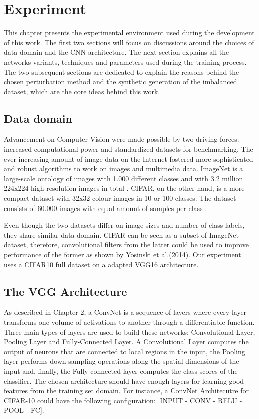 \chapter{Experiment}

This chapter presents the experimental environment used during the development of this work. The first two sections will focus on discussions around the choices of data domain and the CNN architecture. The next section explains all the networks variants, techniques and parameters used during the training process. The two subsequent sections are dedicated to explain the reasons behind the chosen perturbation method and the synthetic generation of the imbalanced dataset, which are the core ideas behind this work.
\section{Data domain}

Advancement on Computer Vision were made possible by two driving forces: increased computational power and standardized datasets for benchmarking. The ever increasing amount of image data on the Internet fostered more sophisticated and robust algorithms to work on images and multimedia data. ImageNet is a large-scale ontology of images with 1.000 different classes and with 3.2 million 224x224 high resolution images in total \cite{deng2009imagenet}. CIFAR, on the other hand, is a more compact dataset with 32x32 colour images in 10 or 100 classes. The dataset consists of 60.000 images with equal amount of samples per class \cite{krizhevsky_2009}.

Even though the two datasets differ on image sizes and number of class labels, they share similar data domain. CIFAR can be seen as a subset of ImageNet dataset, therefore, convolutional filters from the latter could be used to improve performance of the former as shown by Yosinski et al.(2014). Our experiment uses a CIFAR10 full dataset on a adapted VGG16 architecture.

\section{The VGG Architecture}

As described in Chapter 2, a ConvNet is a sequence of layers where every layer transforms one volume of activations to another through a differentiable function. Three main types of layers are used to build these networks: Convolutional Layer, Pooling Layer and Fully-Connected Layer. A Convolutional Layer computes the output of neurons that are connected to local regions in the input, the Pooling layer performs down-sampling operations along the spatial dimensions of the input and, finally, the Fully-connected layer computes the class scores of the classifier. The chosen architecture should have enough layers for learning good features from the training set domain. For instance, a ConvNet Architecutre for CIFAR-10 could have the following configuration: [INPUT - CONV - RELU - POOL - FC].

